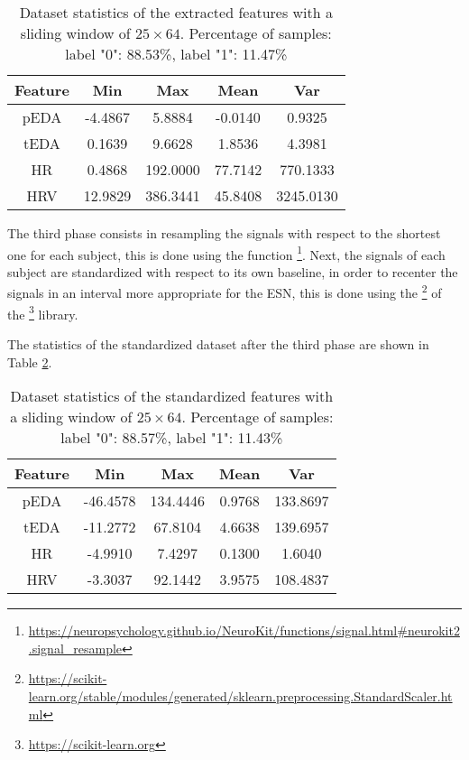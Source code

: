 {\renewcommand{\arraystretch}{1.5}
\begin{table}[H]
    \centering
    \begin{tabular}{|c|c|c|c|c|}
        \hline
        Feature & Min & Max & Mean & Var \\ \hline\hline
        pEDA & -4.4867 & 5.8884 & -0.0140 & 0.9325 \\ \hline
        tEDA & 0.1639 & 9.6628 & 1.8536 & 4.3981 \\ \hline
        HR & 0.4868 & 192.0000 & 77.7142 & 770.1333 \\ \hline
        HRV & 12.9829 & 386.3441 & 45.8408 & 3245.0130 \\ \hline
    \end{tabular}
    \caption{Dataset statistics of the extracted features with a sliding window of $25\times 64$. Percentage of samples: label "0": 88.53\%, label "1": 11.47\%}
    \label{tab:data_1}
\end{table}

The third phase consists in resampling the signals with respect to the shortest one for each subject, this is done using the function \footnote{\url{https://neuropsychology.github.io/NeuroKit/functions/signal.html#neurokit2.signal_resample}}. Next, the signals of each subject are standardized with respect to its own baseline, in order to recenter the signals in an interval more appropriate for the ESN, this is done using the \footnote{\url{https://scikit-learn.org/stable/modules/generated/sklearn.preprocessing.StandardScaler.html}} of the \footnote{\url{https://scikit-learn.org}} library.

The statistics of the standardized dataset after the third phase are shown in Table \ref{tab:data_2}.

{\renewcommand{\arraystretch}{1.5}
\begin{table}[H]
    \centering
    \begin{tabular}{|c|c|c|c|c|}
        \hline
        Feature & Min & Max & Mean & Var \\ \hline\hline
        pEDA & -46.4578 & 134.4446 & 0.9768 & 133.8697 \\ \hline
        tEDA & -11.2772 & 67.8104 & 4.6638 & 139.6957 \\ \hline
        HR & -4.9910 & 7.4297 & 0.1300 & 1.6040 \\ \hline
        HRV & -3.3037 & 92.1442 & 3.9575 & 108.4837 \\ \hline
    \end{tabular}
    \caption{Dataset statistics of the standardized features with a sliding window of $25\times 64$. Percentage of samples: label "0": 88.57\%, label "1": 11.43\%}
    \label{tab:data_2}
\end{table}

}}
